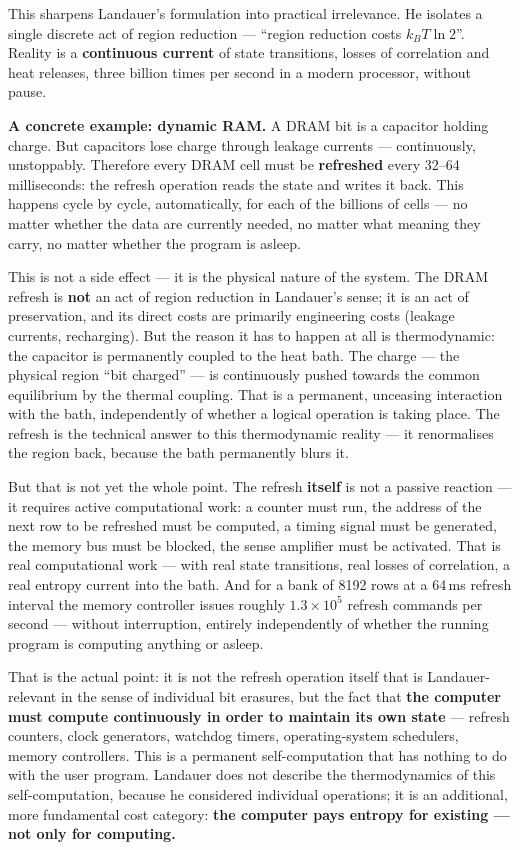 \documentclass[11pt,a4paper]{article}
\begin{document}
This sharpens Landauer's formulation into practical irrelevance. He isolates a
single discrete act of region reduction --- “region reduction costs
$k_B T \ln 2$”. Reality is a \textbf{continuous current} of state transitions,
losses of correlation and heat releases, three billion times per second in a
modern processor, without pause.

\textbf{A concrete example: dynamic RAM.} A DRAM bit is a capacitor holding
charge. But capacitors lose charge through leakage currents --- continuously,
unstoppably. Therefore every DRAM cell must be \textbf{refreshed} every
32--64 milliseconds: the refresh operation reads the state and writes it back.
This happens cycle by cycle, automatically, for each of the billions of cells ---
no matter whether the data are currently needed, no matter what meaning they
carry, no matter whether the program is asleep.

This is not a side effect --- it is the physical nature of the system. The DRAM
refresh is \textbf{not} an act of region reduction in Landauer's sense; it is an
act of preservation, and its direct costs are primarily engineering costs (leakage
currents, recharging). But the reason it has to happen at all is thermodynamic:
the capacitor is permanently coupled to the heat bath. The charge --- the physical
region “bit charged” --- is continuously pushed towards the common equilibrium by
the thermal coupling. That is a permanent, unceasing interaction with the bath,
independently of whether a logical operation is taking place. The refresh is the
technical answer to this thermodynamic reality --- it renormalises the region
back, because the bath permanently blurs it.

But that is not yet the whole point. The refresh \textbf{itself} is not a passive
reaction --- it requires active computational work: a counter must run, the
address of the next row to be refreshed must be computed, a timing signal must be
generated, the memory bus must be blocked, the sense amplifier must be activated.
That is real computational work --- with real state transitions, real losses of
correlation, a real entropy current into the bath. And for a bank of 8192 rows at
a 64\,ms refresh interval the memory controller issues roughly
$1.3\times10^{5}$ refresh commands per second --- without interruption, entirely
independently of whether the running program is computing anything or asleep.

That is the actual point: it is not the refresh operation itself that is
Landauer-relevant in the sense of individual bit erasures, but the fact that
\textbf{the computer must compute continuously in order to maintain its own
state} --- refresh counters, clock generators, watchdog timers, operating-system
schedulers, memory controllers. This is a permanent self-computation that has
nothing to do with the user program. Landauer does not describe the
thermodynamics of this self-computation, because he considered individual
operations; it is an additional, more fundamental cost category:
\textbf{the computer pays entropy for existing --- not only for computing.}
\end{document}
